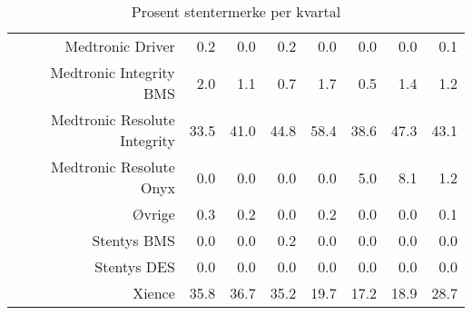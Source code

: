 \documentclass[presentation,xcolor=pdftex,dvipsnames,table]{beamer}
\begin{document}
\begin{frame}
\begin{tiny}
\begin{table}[ht]
\begin{tabular}{rrrrrrrr}
  Medtronic Driver & 0.2 & 0.0 & 0.2 & 0.0 & 0.0 & 0.0 & 0.1 \\ 
  Medtronic Integrity BMS & 2.0 & 1.1 & 0.7 & 1.7 & 0.5 & 1.4 & 1.2 \\ 
  Medtronic Resolute Integrity & 33.5 & 41.0 & 44.8 & 58.4 & 38.6 & 47.3 & 43.1 \\ 
  Medtronic Resolute Onyx & 0.0 & 0.0 & 0.0 & 0.0 & 5.0 & 8.1 & 1.2 \\ 
  Øvrige & 0.3 & 0.2 & 0.0 & 0.2 & 0.0 & 0.0 & 0.1 \\ 
  Stentys BMS & 0.0 & 0.0 & 0.2 & 0.0 & 0.0 & 0.0 & 0.0 \\ 
  Stentys DES & 0.0 & 0.0 & 0.0 & 0.0 & 0.0 & 0.0 & 0.0 \\ 
  Xience & 35.8 & 36.7 & 35.2 & 19.7 & 17.2 & 18.9 & 28.7 \\ 
   \bottomrule
\end{tabular}
\caption{Prosent stentermerke per kvartal} 
\end{table}\end{tiny}
\end{frame}
\end{document}
